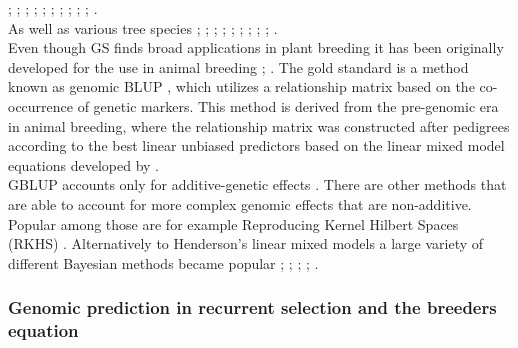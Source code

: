 \cite{Sukumaran_2016}; \cite{Bustos_Korts_2016}; \cite{Gianola_2016_wheat};
\cite{Crossa_2016_wheat}; \cite{Rincent_2018}; \cite{Norman_2018}; \cite{Belamkar_2018};
\cite{Ovenden_2018}; \cite{Cuevas_2019}; \cite{Howard_2019}; \cite{Krause_2019}. \\
As well as various tree species \cite{Holliday_2012}; \cite{Resende_2012}; \cite{Zapata_Valenzuela_2013};  \cite{Jaramillo_Correa_2014}; \cite{Kumar_2015}; \cite{GamalElDien_2016}; \cite{Rincent_2018}; \cite{Ratcliffe_2017}; \cite{Kainer_2018}; \cite{deAlmeidaFilho2019}. \\
Even though GS finds broad applications in plant breeding it has been originally developed
for the use in animal breeding \cite{hayes2010genome}; \cite{goddard2011using}. The gold
standard is a method known as genomic BLUP \cite{vanraden2008efficient}, which utilizes a
relationship matrix based on the co-occurrence of genetic markers. This method is derived
from the pre-genomic era in animal breeding, where the relationship matrix was constructed
after pedigrees according to the best linear unbiased predictors based on the linear mixed
model equations developed by \cite{henderson1975best}. \\
GBLUP accounts only for additive-genetic effects \cite{vanraden2008efficient}. There are
other methods that are able to account for more complex genomic effects that are
non-additive. Popular among those are for example Reproducing Kernel Hilbert Spaces (RKHS)
\cite{gianola2008reproducing}. Alternatively to Henderson's linear mixed models a large
variety of different Bayesian methods became popular \cite{hayes2001}; \cite{gianola2009};
\cite{habier2011}; \cite{gianola2013}; \cite{crossa2017}.

\subsubsection{Genomic prediction in recurrent selection and the breeders equation}

